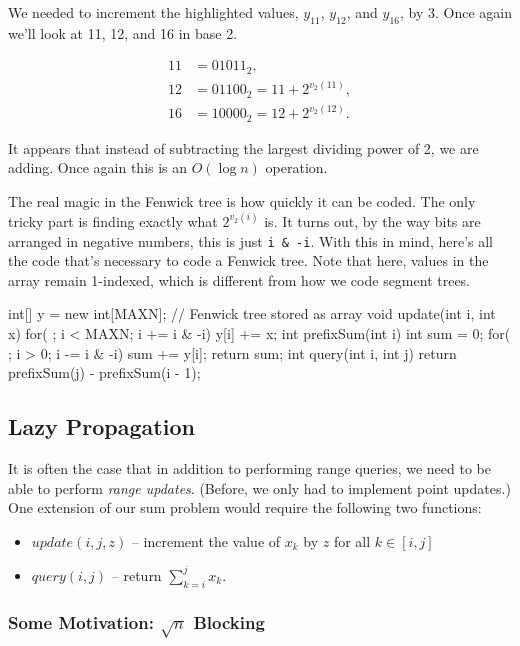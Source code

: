 We needed to increment the highlighted values, $y_{11}$, $y_{12}$, and $y_{16}$, by 3. Once again we'll look at 11, 12, and 16 in base 2.

\begin{align*}
11 &= 01011_2, \\
12 &= 01100_2 = 11 + 2^{v_2(11)}, \\
16 &= 10000_2 = 12 + 2^{v_2(12)}.
\end{align*}

It appears that instead of subtracting the largest dividing power of 2, we are adding. Once again this is an $O(\log{n})$ operation.

The real magic in the Fenwick tree is how quickly it can be coded. The only tricky part is finding exactly what $2^{v_2(i)}$ is. It turns out, by the way bits are arranged in negative numbers, this is just \texttt{i \& -i}. With this in mind, here's all the code that's necessary to code a Fenwick tree. Note that here, values in the array remain 1-indexed, which is different from how we code segment trees.

\begin{mylstlisting}
int[] y = new int[MAXN]; // Fenwick tree stored as array
void update(int i, int x) {
	for( ; i < MAXN; i += i & -i)
		y[i] += x;
}
int prefixSum(int i) {
	int sum = 0;
	for( ; i > 0; i -= i & -i)
		sum += y[i];
	return sum;
}
int query(int i, int j) {
	return prefixSum(j) - prefixSum(i - 1);
}
\end{mylstlisting}

\subsection{Lazy Propagation}

It is often the case that in addition to performing range queries, we need to be able to perform \textit{range updates}. (Before, we only had to implement point updates.) One extension of our sum problem would require the following two functions:

\begin{itemize}
\item
$update(i, j, z)$ -- increment the value of $x_k$ by $z$ for all $k\in [i,j]$

\item
$query(i, j)$ -- return $\sum_{k=i}^j x_k$.
\end{itemize}

\subsubsection{Some Motivation: $\sqrt{n}$ Blocking}

